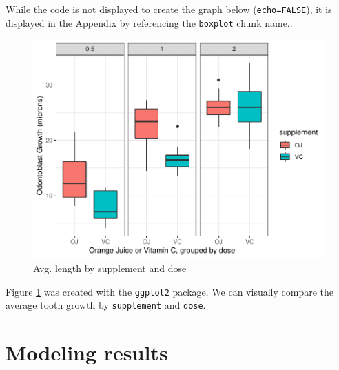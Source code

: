 \documentclass[12pt,oneside]{chicagocapstone}
\begin{document}
While the code is not displayed to create the graph below
(\texttt{echo=FALSE}), it is displayed in the Appendix by referencing
the \texttt{boxplot} chunk name..
\begin{figure}
\centering
\includegraphics{UChicago-MScA-Capstone_files/figure-latex/boxplot-1.pdf}
\caption{\label{fig:boxplot}Avg. length by supplement and dose}
\end{figure}
Figure \ref{fig:boxplot} was created with the \texttt{ggplot2} package.
We can visually compare the average tooth growth by \texttt{supplement}
and \texttt{dose}.

\section*{Modeling results}\label{modeling-results}
\end{document}
